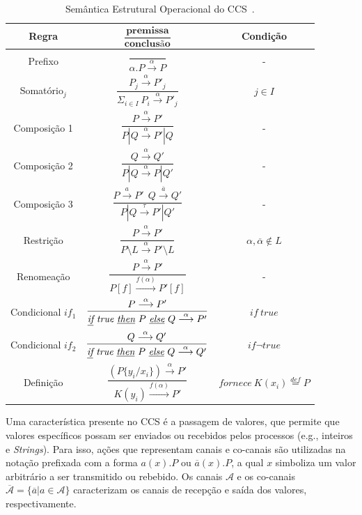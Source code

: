 \begin{table}[!ht]
	\centering\tiny{
		\caption{Semântica Estrutural Operacional do CCS~\cite{milner1986ccs}.} \label{tab:ccs_sos}}
\begin{tabular}{|c|c|c|}
	\hline 
	\textbf{Regra} & $\dfrac{\textbf{premissa}}{\textbf{conclusão}}$ & \textbf{Condição} \\ 
	\hline 
	Prefixo & $\dfrac{}{\alpha.P\stackrel{\alpha}{\longrightarrow}P}$ & - \\ 
	\hline 
	Somatório$_{j}$ & $\dfrac{P_{j}\stackrel{\alpha}{\longrightarrow}P'_{j}}{\Sigma_{i\in I}~P_{i}\stackrel{\alpha}{\longrightarrow}P'_{j}}$ & $j \in I$ \\ 
	\hline 
	Composição 1 & $\dfrac{P \stackrel{\alpha}{\longrightarrow}P'}{P|Q\stackrel{\alpha}{\longrightarrow}P'|Q}$ & - \\ 
	\hline 
	Composição 2 & $\dfrac{Q\stackrel{\alpha}{\longrightarrow}Q'}{P|Q\stackrel{\alpha}{\longrightarrow}P|Q'}$ & - \\ 
	\hline 
	Composição 3 & $\dfrac{P\stackrel{a}{\longrightarrow}P'~~Q\stackrel{\overline{a}}{\longrightarrow}Q'}{P|Q\stackrel{\tau}{\longrightarrow}P'|Q'}$ & - \\ 
	\hline 
	Restrição & $\dfrac{P\stackrel{\alpha}{\longrightarrow}P'}{P\setminus L\stackrel{\alpha}{\longrightarrow}P'\setminus L}$ & $\alpha, \overline{\alpha} \notin L$ \\ 
	\hline 
	Renomeação & $\dfrac{P\stackrel{\alpha}{\longrightarrow}P'}{P[f]\stackrel{f(\alpha)}{\longrightarrow}P'[f]}$ & - \\ 
	\hline 
	Condicional $if_{1}$ & $\dfrac{P\stackrel{\alpha}{\longrightarrow}P'}{\textit{\underline{if}}~\textit{true}~\textit{\underline{then}}~P~\textit{\underline{else}}~Q\stackrel{\alpha}{\longrightarrow}P'}$ & $if~true$ \\ 
	\hline 
	Condicional $if_{2}$ & $\dfrac{Q\stackrel{\alpha}{\longrightarrow}Q'}{\textit{\underline{if}}~\textit{true}~\textit{\underline{then}}~P~\textit{\underline{else}}~Q\stackrel{\alpha}{\longrightarrow}Q'}$ & $if\neg true$ \\ 
	\hline 
	Definição & $\dfrac{(P\{y_{i}/x_{i}\})\stackrel{\alpha}{\longrightarrow}P'}{K(y_{i})\stackrel{f(\alpha)}{\longrightarrow}P'}$ & $fornece~K(x_{i})\stackrel{def}{=} P$ \\ 
	\hline 
\end{tabular} 
\end{table} 

Uma característica presente no CCS é a passagem de valores, que permite que valores específicos possam ser enviados ou recebidos pelos processos (e.g., inteiros e \textit{Strings}). Para isso, ações que representam canais e co-canais são utilizadas na notação prefixada com a forma $a(x).P$ ou $\overline{a}(x).P$, a qual $x$ simboliza um valor arbitrário a ser transmitido ou rebebido. Os canais $\mathcal{A}$ e os co-canais $\mathcal{\overline{A}} = \{\overline{a}|a \in \mathcal{A}\}$ caracterizam os canais de recepção e saída dos valores, respectivamente.

